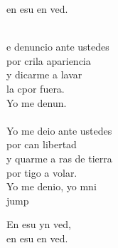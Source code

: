 \begin{cancion}
\begin{chorus}
	en esu en ved.\\
	\end{chorus}%
	\jump\\
	e denuncio ante ustedes \\
	por crila apariencia \\
	y dicarme a lavar \\
	la cpor fuera. \\
	Yo me denun. \\
	\jump\\
	Yo me deio ante ustedes \\
	por can libertad \\
	y quarme a ras de tierra \\
	por tigo a volar. \\
	Yo me denio, yo mni\\jump\\
	\begin{chorus}%
	En esu yn ved, \\
	en esu en ved.\\
	\end{chorus}%
	\jump\\
\end{cancion}%
